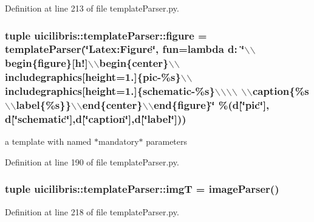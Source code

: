 \-Definition at line 213 of file template\-Parser.\-py.

\hypertarget{namespaceuicilibris_1_1templateParser_ab62a7d06d49e36920493eedea1e78799}{
\subsubsection[{figure}]{\setlength{\rightskip}{0pt plus 5cm}tuple {\bf uicilibris\-::template\-Parser\-::figure} = {\bf template\-Parser}(\char`\"{}\-Latex\-:\-Figure\char`\"{}, fun=lambda d\-: \char`\"{}$\backslash$$\backslash$begin\{{\bf figure}\}\mbox{[}h!\mbox{]}$\backslash$$\backslash$begin\{center\}$\backslash$$\backslash$includegraphics\mbox{[}height=1.\-5cm\mbox{]}\{pic-\/\%s\}$\backslash$$\backslash$includegraphics\mbox{[}height=1.\-5cm\mbox{]}\{schematic-\/\%s\}$\backslash$$\backslash$$\backslash$$\backslash$ $\backslash$$\backslash$caption\{\%s$\backslash$$\backslash$label\{\%s\}\}$\backslash$$\backslash$end\{center\}$\backslash$$\backslash$end\{figure\}\char`\"{} \%(d\mbox{[}\char`\"{}pic\char`\"{}\mbox{]}, d\mbox{[}\char`\"{}schematic\char`\"{}\mbox{]},d\mbox{[}\char`\"{}caption\char`\"{}\mbox{]},d\mbox{[}\char`\"{}label\char`\"{}\mbox{]}))}}\label{namespaceuicilibris_1_1templateParser_ab62a7d06d49e36920493eedea1e78799}


a template with named $\ast$mandatory$\ast$ parameters 



\-Definition at line 190 of file template\-Parser.\-py.

\hypertarget{namespaceuicilibris_1_1templateParser_aa96add71a0f0412a1a5189b52c4fa2a8}{
\subsubsection[{img\-T}]{\setlength{\rightskip}{0pt plus 5cm}tuple {\bf uicilibris\-::template\-Parser\-::img\-T} = {\bf image\-Parser}()}}\label{namespaceuicilibris_1_1templateParser_aa96add71a0f0412a1a5189b52c4fa2a8}


\-Definition at line 218 of file template\-Parser.\-py.

